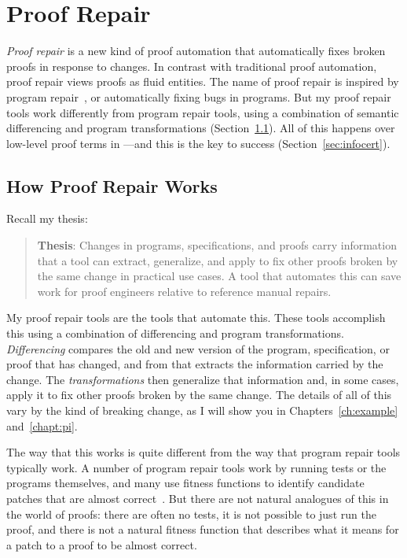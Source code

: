 \section{Proof Repair}
\label{sec:mot-rep}

\textit{Proof repair} is a new kind of proof automation that automatically fixes broken proofs in response to changes.
In contrast with traditional proof automation, proof repair views proofs as fluid entities.
The name of proof repair is inspired by program repair~\cite{Monperrus:2018:ASR:3177787.3105906, Gazzola:2018:ASR:3180155.3182526},
or automatically fixing bugs in programs.
But my proof repair tools work differently from program repair tools, 
using a combination of semantic differencing and program transformations (Section~\ref{sec:how}).
All of this happens over low-level proof terms in ---and this is the key to success (Section~\ref{sec:infocert}).

\subsection{How Proof Repair Works}
\label{sec:how}

Recall my thesis:

\begin{quote}
\textbf{Thesis}: Changes in programs, specifications, and proofs carry information that a tool can extract, generalize, and apply to fix other proofs broken by the same change in practical use cases. A tool that automates this can save work for proof engineers relative to reference manual repairs.
\end{quote}
My proof repair tools are the tools that automate this.
These tools accomplish this using a combination of differencing and program transformations.
\textit{Differencing} compares the old and new version of the program, specification, or proof that has changed,
and from that extracts the information carried by the change.
The \textit{transformations} then generalize that information and, in some cases, apply it to fix other proofs broken by the same change.
The details of all of this vary by the kind of breaking change,
as I will show you in Chapters~\ref{ch:example} and~\ref{chapt:pi}.


The way that this works is quite different from the way that program repair tools typically work.
A number of program repair tools work by running tests or the programs themselves,
and many use fitness functions to identify candidate patches that 
are almost correct~\cite{Monperrus:2018:ASR:3177787.3105906}. %
But there are not natural analogues of this in the world of proofs:
there are often no tests, it is not possible to just run the proof, and there is not a natural 
fitness function that describes what it means for a patch to a proof to be almost correct.

